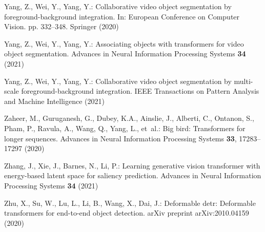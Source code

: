 \documentclass[runningheads]{llncs}
\begin{document}
\begin{thebibliography}{10}
Yang, Z., Wei, Y., Yang, Y.: Collaborative video object segmentation by
  foreground-background integration. In: European Conference on Computer
  Vision. pp. 332--348. Springer (2020)

Yang, Z., Wei, Y., Yang, Y.: Associating objects with transformers for video
  object segmentation. Advances in Neural Information Processing Systems
  \textbf{34} (2021)

Yang, Z., Wei, Y., Yang, Y.: Collaborative video object segmentation by
  multi-scale foreground-background integration. IEEE Transactions on Pattern
  Analysis and Machine Intelligence  (2021)

Zaheer, M., Guruganesh, G., Dubey, K.A., Ainslie, J., Alberti, C., Ontanon, S.,
  Pham, P., Ravula, A., Wang, Q., Yang, L., et~al.: Big bird: Transformers for
  longer sequences. Advances in Neural Information Processing Systems
  \textbf{33},  17283--17297 (2020)

Zhang, J., Xie, J., Barnes, N., Li, P.: Learning generative vision transformer
  with energy-based latent space for saliency prediction. Advances in Neural
  Information Processing Systems  \textbf{34} (2021)

Zhu, X., Su, W., Lu, L., Li, B., Wang, X., Dai, J.: Deformable detr: Deformable
  transformers for end-to-end object detection. arXiv preprint arXiv:2010.04159
   (2020)

\end{thebibliography}
 
\end{document}
